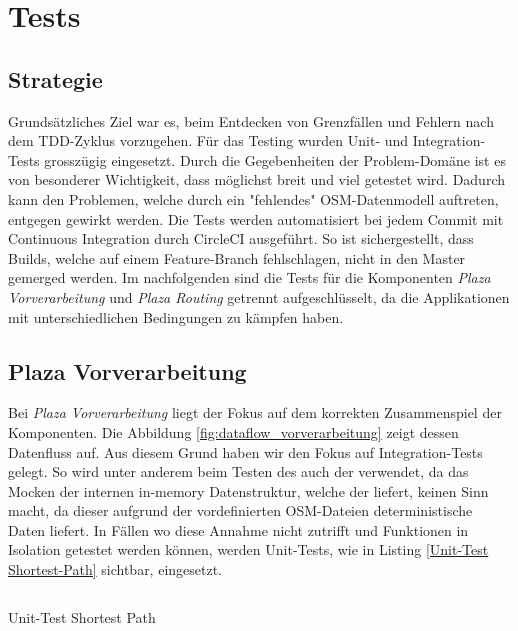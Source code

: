 
\section{Tests}
\label{sec:Tests}

\subsection{Strategie}
\label{test:Strategie}
Grundsätzliches Ziel war es, beim Entdecken von Grenzfällen und Fehlern nach dem \ac{TDD}-Zyklus vorzugehen. Für das Testing wurden Unit- und Integration-Tests grosszügig eingesetzt. Durch die Gegebenheiten der Problem-Domäne ist es von besonderer Wichtigkeit, dass möglichst breit und viel getestet wird. Dadurch kann den Problemen, welche durch ein "fehlendes" \ac{OSM}-Datenmodell auftreten, entgegen gewirkt werden.  Die Tests werden automatisiert bei jedem Commit mit Continuous Integration durch CircleCI \cite{circleci} ausgeführt. So ist sichergestellt, dass Builds, welche auf einem Feature-Branch fehlschlagen, nicht in den Master gemerged werden. Im nachfolgenden sind die Tests für die Komponenten \emph{Plaza Vorverarbeitung} und \emph{Plaza Routing} getrennt aufgeschlüsselt, da die Applikationen mit unterschiedlichen Bedingungen zu kämpfen haben.


\subsection{Plaza Vorverarbeitung}
\label{test:Plaza Vorverarbeitung}
Bei \emph{Plaza Vorverarbeitung} liegt der Fokus auf dem korrekten Zusammenspiel der Komponenten. Die Abbildung \ref{fig:dataflow_vorverarbeitung} zeigt dessen Datenfluss auf. Aus diesem Grund haben wir den Fokus auf Integration-Tests gelegt. So wird unter anderem beim Testen des  auch der  verwendet, da das Mocken der internen in-memory Datenstruktur, welche der  liefert, keinen Sinn macht, da dieser aufgrund der vordefinierten \ac{OSM}-Dateien deterministische Daten liefert. In Fällen wo diese Annahme nicht zutrifft und Funktionen in Isolation getestet werden können, werden Unit-Tests, wie in Listing \ref{Unit-Test Shortest-Path} sichtbar, eingesetzt.

\begin{listing}[ht]
    \inputminted{python}{projectdoc/listing/test_compute_dijkstra_shortest_paths.py}
    \caption{Unit-Test Shortest Path}
    \label{Unit-Test Shortest-Path}
\end{listing}

